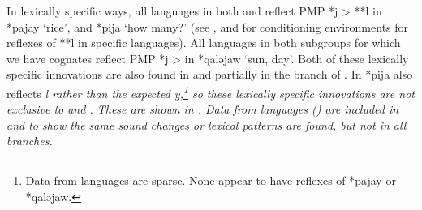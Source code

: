 In lexically specific ways,
all languages in both 
and  reflect PMP *j > **l in *pajay ‘rice’,
and *pija ‘how many?’ (see ,
and  for conditioning environments for reflexes of
**l in specific languages).
All languages in both subgroups for which we have cognates reflect
PMP *j > {\0} in *qaləjaw ‘sun, day’.
Both of these lexically specific innovations are also found in
 and partially in the  branch of .
In  *pija also reflects \it{l} rather than the expected
\it{y},\footnote{
		Data from  languages are sparse.
		None appear to have reflexes of *pajay or *qaləjaw.}
so these lexically specific innovations are not exclusive to 
and .
These are shown in .
Data from  languages ()
are included in 
and  to show the same sound changes or lexical patterns
are found, but not in all branches.

